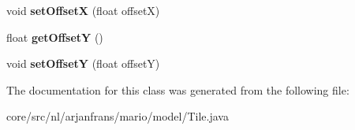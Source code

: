 \begin{DoxyCompactItemize}
\mbox{\label{classnl_1_1arjanfrans_1_1mario_1_1model_1_1Tile_a3c79a1c221004c147c3040776e4cdd10}} 
void {\bfseries set\+OffsetX} (float offsetX)
\item 
\mbox{\label{classnl_1_1arjanfrans_1_1mario_1_1model_1_1Tile_ac86196e0de9a6e33910ac046a4dbe03c}} 
float {\bfseries get\+OffsetY} ()
\item 
\mbox{\label{classnl_1_1arjanfrans_1_1mario_1_1model_1_1Tile_a841263b4394886e8581d783292eb1132}} 
void {\bfseries set\+OffsetY} (float offsetY)
\end{DoxyCompactItemize}


The documentation for this class was generated from the following file\+:\begin{DoxyCompactItemize}
\item 
core/src/nl/arjanfrans/mario/model/Tile.\+java\end{DoxyCompactItemize}
